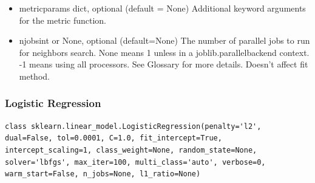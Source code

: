 \documentclass[12pt]{article}
\begin{document}
\begin{itemize}
\item
metric\textunderscore params dict, optional (default = None)
Additional keyword arguments for the metric function.

\item
n\textunderscore jobsint or None, optional (default=None)
The number of parallel jobs to run for neighbors search. None means 1 unless in a joblib.parallel\textunderscore backend context. -1 means using all processors. See Glossary for more details. Doesn’t affect fit method.
\end{itemize}

\newpage
\subsubsection{Logistic Regression}
\begin{lstlisting}
class sklearn.linear_model.LogisticRegression(penalty='l2', dual=False, tol=0.0001, C=1.0, fit_intercept=True, intercept_scaling=1, class_weight=None, random_state=None, solver='lbfgs', max_iter=100, multi_class='auto', verbose=0, warm_start=False, n_jobs=None, l1_ratio=None)
\end{lstlisting}
\end{document}
